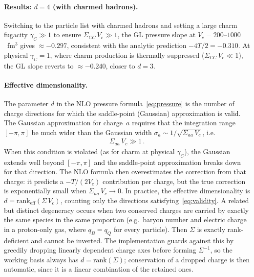 \documentclass[11pt]{article}
\begin{document}
\paragraph{Results: $d = 4$ (with charmed hadrons).}
Switching to the particle list with charmed hadrons and setting a large charm fugacity $\gamma_C \gg 1$ to ensure $\Sigma_{CC}\,V_c \gg 1$, the GL pressure slope at $V_c = 200$--$1000$~fm$^3$ gives $\approx -0.297$, consistent with the analytic prediction $-4T/2 = -0.310$.
At physical $\gamma_C = 1$, where charm production is thermally suppressed ($\Sigma_{CC}\,V_c \ll 1$), the GL slope reverts to $\approx -0.240$, closer to $d = 3$.

\paragraph{Effective dimensionality.}
The parameter $d$ in the NLO pressure formula~\eqref{eq:pressure} is the number of charge directions for which the saddle-point (Gaussian) approximation is valid.
The Gaussian approximation for charge~$a$ requires that the integration range $[-\pi, \pi]$ be much wider than the Gaussian width $\sigma_a \sim 1/\sqrt{\Sigma_{aa}\,V_c}$, i.e.\
\begin{align}
  \Sigma_{aa}\,V_c \gg 1 \,.
  \label{eq:validity}
\end{align}
When this condition is violated (as for charm at physical $\gamma_C$), the Gaussian extends well beyond $[-\pi, \pi]$ and the saddle-point approximation breaks down for that direction.
The NLO formula then overestimates the correction from that charge: it predicts a $-T/(2V_c)$ contribution per charge, but the true correction is exponentially small when $\Sigma_{aa}\,V_c \to 0$.
In practice, the effective dimensionality is $d = \mathrm{rank}_\mathrm{eff}(\Sigma\,V_c)$, counting only the directions satisfying~\eqref{eq:validity}.
A related but distinct degeneracy occurs when two conserved charges are carried by exactly the same species in the same proportion (e.g.\ baryon number and electric charge in a proton-only gas, where $q_B = q_Q$ for every particle).  Then $\Sigma$ is exactly rank-deficient and cannot be inverted.  The implementation guards against this by greedily dropping linearly dependent charge axes before forming $\Sigma^{-1}$, so the working basis always has $d = \mathrm{rank}(\Sigma)$; conservation of a dropped charge is then automatic, since it is a linear combination of the retained ones.
\end{document}
